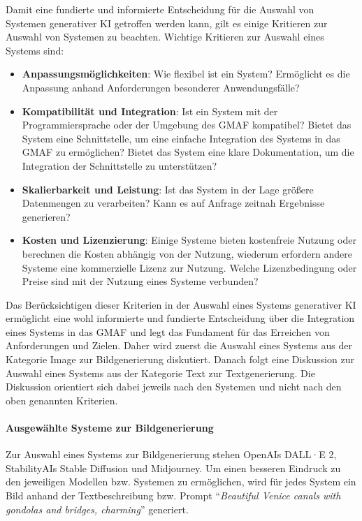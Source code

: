 Damit eine fundierte und informierte Entscheidung für die Auswahl von Systemen generativer KI getroffen werden kann, gilt es einige Kritieren zur Auswahl von Systemen zu beachten.
Wichtige Kritieren zur Auswahl eines Systems sind:
\begin{itemize}
    \item \textbf{Anpassungsmöglichkeiten}: Wie flexibel ist ein System?
    Ermöglicht es die Anpassung anhand Anforderungen besonderer Anwendungsfälle?
    \item \textbf{Kompatibilität und Integration}: Ist ein System mit der Programmiersprache oder der Umgebung des GMAF kompatibel?
    Bietet das System eine Schnittstelle, um eine einfache Integration des Systems in das GMAF zu ermöglichen?
    Bietet das System eine klare Dokumentation, um die Integration der Schnittstelle zu unterstützen?
    \item \textbf{Skalierbarkeit und Leistung}: Ist das System in der Lage größere Datenmengen zu verarbeiten?
    Kann es auf Anfrage zeitnah Ergebnisse generieren?
    \item \textbf{Kosten und Lizenzierung}: Einige Systeme bieten kostenfreie Nutzung oder berechnen die Kosten abhängig von der Nutzung, wiederum erfordern andere Systeme eine kommerzielle Lizenz zur Nutzung. 
    Welche Lizenzbedingung oder Preise sind mit der Nutzung eines Systeme verbunden?
\end{itemize}

Das Berücksichtigen dieser Kriterien in der Auswahl eines Systems generativer KI ermöglicht eine wohl informierte und fundierte Entscheidung über die Integration eines Systems in das GMAF und legt das Fundament für das Erreichen von Anforderungen und Zielen.
Daher wird zuerst die Auswahl eines Systems aus der Kategorie Image zur Bildgenerierung diskutiert.
Danach folgt eine Diskussion zur Auswahl eines Systems aus der Kategorie Text zur Textgenerierung.
Die Diskussion orientiert sich dabei jeweils nach den Systemen und nicht nach den oben genannten Kriterien.

\paragraph{Ausgewählte Systeme zur Bildgenerierung}
Zur Auswahl eines Systems zur Bildgenerierung stehen OpenAIs DALL·E 2, StabilityAIs Stable Diffusion und Midjourney.
Um einen besseren Eindruck zu den jeweiligen Modellen bzw. Systemen zu ermöglichen, wird für jedes System ein Bild anhand der Textbeschreibung bzw. Prompt \enquote{\textit{Beautiful Venice canals with gondolas and bridges, charming}} generiert.

